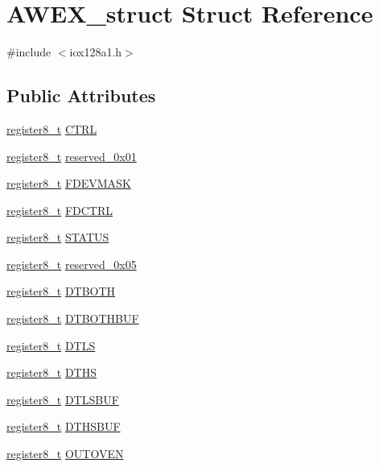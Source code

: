 \hypertarget{struct_a_w_e_x__struct}{
\section{AWEX\_\-struct Struct Reference}
\label{struct_a_w_e_x__struct}
}


{\ttfamily \#include $<$iox128a1.h$>$}

\subsection*{Public Attributes}
\begin{DoxyCompactItemize}
\item 
\hyperlink{iox128a1_8h_a6a0649252b392263406882923b04a9db}{register8\_\-t} \hyperlink{struct_a_w_e_x__struct_aac954aa43ab948ad37adb7cf0be52057}{CTRL}
\item 
\hyperlink{iox128a1_8h_a6a0649252b392263406882923b04a9db}{register8\_\-t} \hyperlink{struct_a_w_e_x__struct_aa30b96a5ec2d96a93cb82aacfbd1340f}{reserved\_\-0x01}
\item 
\hyperlink{iox128a1_8h_a6a0649252b392263406882923b04a9db}{register8\_\-t} \hyperlink{struct_a_w_e_x__struct_a40ad9ab108db0c8074b752d4662f6bfd}{FDEVMASK}
\item 
\hyperlink{iox128a1_8h_a6a0649252b392263406882923b04a9db}{register8\_\-t} \hyperlink{struct_a_w_e_x__struct_a75f2ed02d61d96e36ae17d39c74d1c94}{FDCTRL}
\item 
\hyperlink{iox128a1_8h_a6a0649252b392263406882923b04a9db}{register8\_\-t} \hyperlink{struct_a_w_e_x__struct_acffb4313fe7461a88478648e4fa28242}{STATUS}
\item 
\hyperlink{iox128a1_8h_a6a0649252b392263406882923b04a9db}{register8\_\-t} \hyperlink{struct_a_w_e_x__struct_aef895e95ce97706f18e130dba875f58e}{reserved\_\-0x05}
\item 
\hyperlink{iox128a1_8h_a6a0649252b392263406882923b04a9db}{register8\_\-t} \hyperlink{struct_a_w_e_x__struct_ad5b03a3a361ce40ad64afe30787cf20d}{DTBOTH}
\item 
\hyperlink{iox128a1_8h_a6a0649252b392263406882923b04a9db}{register8\_\-t} \hyperlink{struct_a_w_e_x__struct_aea8f66130481bddfe1d0d8768563ff8f}{DTBOTHBUF}
\item 
\hyperlink{iox128a1_8h_a6a0649252b392263406882923b04a9db}{register8\_\-t} \hyperlink{struct_a_w_e_x__struct_a452d60a704d5da432d7c9c7420a92e27}{DTLS}
\item 
\hyperlink{iox128a1_8h_a6a0649252b392263406882923b04a9db}{register8\_\-t} \hyperlink{struct_a_w_e_x__struct_af868e8ac0f715ff6d21b4788f8c95e9f}{DTHS}
\item 
\hyperlink{iox128a1_8h_a6a0649252b392263406882923b04a9db}{register8\_\-t} \hyperlink{struct_a_w_e_x__struct_a90b06dd3c3b0fa4fe0695d5bbcaf01fc}{DTLSBUF}
\item 
\hyperlink{iox128a1_8h_a6a0649252b392263406882923b04a9db}{register8\_\-t} \hyperlink{struct_a_w_e_x__struct_a71f36c4a38f9ebe9af57c0b761d63054}{DTHSBUF}
\item 
\hyperlink{iox128a1_8h_a6a0649252b392263406882923b04a9db}{register8\_\-t} \hyperlink{struct_a_w_e_x__struct_ae06cae530bfd7850f10c2354ccf9e21f}{OUTOVEN}
\end{DoxyCompactItemize}



